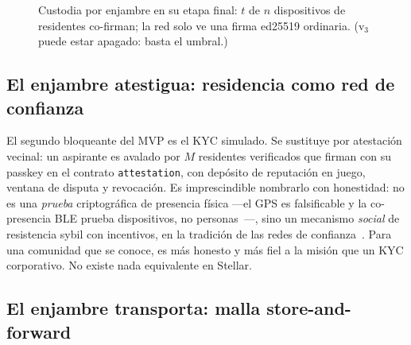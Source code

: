 \documentclass[twocolumn,10pt]{article}
\begin{document}
\begin{figure}[t]
\centering
{}
\caption{Custodia por enjambre en su etapa final: $t$ de $n$ dispositivos de residentes co-firman; la red solo ve una firma ed25519 ordinaria. (v$_3$ puede estar apagado: basta el umbral.)}
\label{fig:frost}
\end{figure}

\subsection{El enjambre atestigua: residencia como red de confianza}
\label{sec:atestacion}

El segundo bloqueante del MVP es el KYC simulado. Se sustituye por atestaci\'on vecinal: un aspirante es avalado por $M$ residentes verificados que firman con su passkey en el contrato \texttt{attestation}, con dep\'osito de reputaci\'on en juego, ventana de disputa y revocaci\'on. Es imprescindible nombrarlo con honestidad: no es una \emph{prueba} criptogr\'afica de presencia f\'isica ---el GPS es falsificable y la co-presencia BLE prueba dispositivos, no personas~\cite{pol}---, sino un mecanismo \emph{social} de resistencia sybil con incentivos, en la tradici\'on de las redes de confianza~\cite{wot}. Para una comunidad que se conoce, es m\'as honesto y m\'as fiel a la misi\'on que un KYC corporativo. No existe nada equivalente en Stellar.

\subsection{El enjambre transporta: malla store-and-forward}
\label{sec:mesh}
\end{document}
